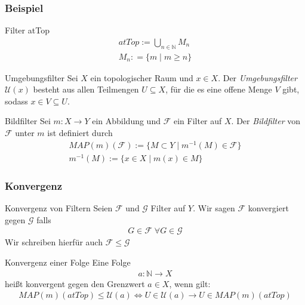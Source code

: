 \documentclass{beamer}
\begin{document}
\begin{frame}
    \frametitle{Beispiel}
   \begin{block}{Filter atTop}
    \begin{align}
        atTop := \bigcup_{n \in \mathbb{N}} M_n  \\
        M_n : = \{ m    \mid m \geq n\}
    \end{align}
    \end{block}   
    \begin{block}{Umgebungsfilter}
      Sei $X$ ein topologischer Raum und $x \in X$. Der \emph{Umgebungsfilter} $\mathcal{U}(x)$ besteht aus allen Teilmengen $U \subseteq X$, für die es eine offene Menge $V$ gibt, sodass $x \in V \subseteq U$.
    \end{block}
    \begin{block}{Bildfilter}
      Sei $m: X \to Y  $ ein Abbildung und $\mathcal{F}$ ein Filter auf $X$. Der \emph{Bildfilter} von $\mathcal{F}$ unter $m$ ist definiert durch 
      \begin{align}
          MAP(m)(\mathcal{F}) := \{ M \subset Y \mid m^{-1} (M) \in \mathcal{F} \}\\  
       m^{-1}(M) := \{ x \in X \mid m(x) \in M \}
      \end{align}
    \end{block}
\end{frame}



\begin{frame}
    \frametitle{Konvergenz}
    \begin{block}{Konvergenz von Filtern}
    Seien  $\mathcal{F}$ und $\mathcal{G}$ Filter auf $Y$. Wir sagen $\mathcal{F}$ konvergiert gegen  $\mathcal{G}$ falls
    \begin{align}
       G \in \mathcal{F} \; \forall G \in \mathcal{G}
    \end{align}
    Wir schreiben hierfür auch $\mathcal{F} \leq \mathcal{G}$
    \end{block}
 
    \begin{block}{Konvergenz einer Folge}
        Eine Folge
    \begin{align*}
            a: \mathbb{N} \rightarrow X
            \end{align*}
    heißt konvergent gegen  den Grenzwert $a \in X$, wenn gilt:
    \begin{align}  
        MAP(m)(atTop) \leq  \mathcal{U}(a) \Leftrightarrow U \in \mathcal{U}(a) \rightarrow U \in MAP(m)(atTop)
    \end{align}
\end{block}

\end{frame}
\end{document}
